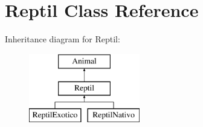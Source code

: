 \hypertarget{class_reptil}{}\section{Reptil Class Reference}
\label{class_reptil}
Inheritance diagram for Reptil\+:\begin{figure}[H]
\begin{center}
\leavevmode
\includegraphics[height=3.000000cm]{class_reptil}
\end{center}
\end{figure}
